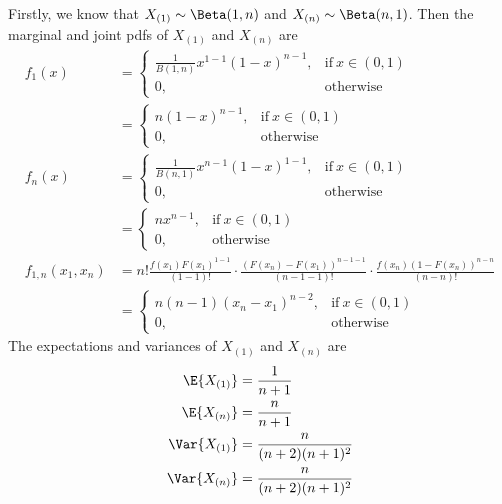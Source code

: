 \documentclass[%
  hwnumber=6,%
  studentnumber=20053722,%
  {name=Bryan Hoang}%
]{%
  mthe353answer%
}
\begin{document}
  \begin{questions}
    \setcounter{question}{1}
    \question{}
    \begin{solution}
      Firstly, we know that \(X_{(1)} \sim \Beta(1,n)\) and \(X_{(n)} \sim \Beta(n,1)\).
      Then the marginal and joint pdfs of \(X_{(1)}\) and \(X_{(n)}\) are
        \begin{align*}
          f_1(x) &= \begin{cases}
            \frac{1}{B(1,n)} x^{1-1}(1-x)^{n-1}, & \text{if}\ x \in (0,1)\\
            0, & \text{otherwise}
          \end{cases}\\
          &= \begin{cases}
            n(1-x)^{n-1} , & \text{if}\ x \in (0,1)\\
            0, & \text{otherwise}
          \end{cases}\\
          f_n(x) &= \begin{cases}
            \frac{1}{B(n,1)} x^{n-1}(1-x)^{1-1}, & \text{if}\ x \in (0,1)\\
            0, & \text{otherwise}
          \end{cases}\\
          &= \begin{cases}
            n x^{n-1}, & \text{if}\ x \in (0,1)\\
            0, & \text{otherwise}
          \end{cases}\\
          f_{1,n}(x_1,x_n) &= n! \frac{f(x_1)F(x_1)^{1-1}}{(1-1)!}
            \cdot \frac{(F(x_n)-F(x_1))^{n-1-1}}{(n-1-1)!}
            \cdot \frac{f(x_n)(1-F(x_n))^{n-n}}{(n-n)!}\\
           &= \begin{cases}
            n(n-1) (x_n-x_1)^{n-2}, & \text{if}\ x \in (0,1)\\
            0, & \text{otherwise}
           \end{cases}
        \end{align*}
        The expectations and variances of \(X_{(1)}\) and \(X_{(n)}\) are
        \begin{align*}
          \E{X_{(1)}} &= \frac{1}{n+1}\\
          \E{X_{(n)}} &= \frac{n}{n+1}\\
          \Var{X_{(1)}} &= \frac{n}{(n+2)(n+1)^2}\\
          \Var{X_{(n)}} &= \frac{n}{(n+2)(n+1)^2}

\end{align*}
\end{solution}
\end{questions}
\end{document}
